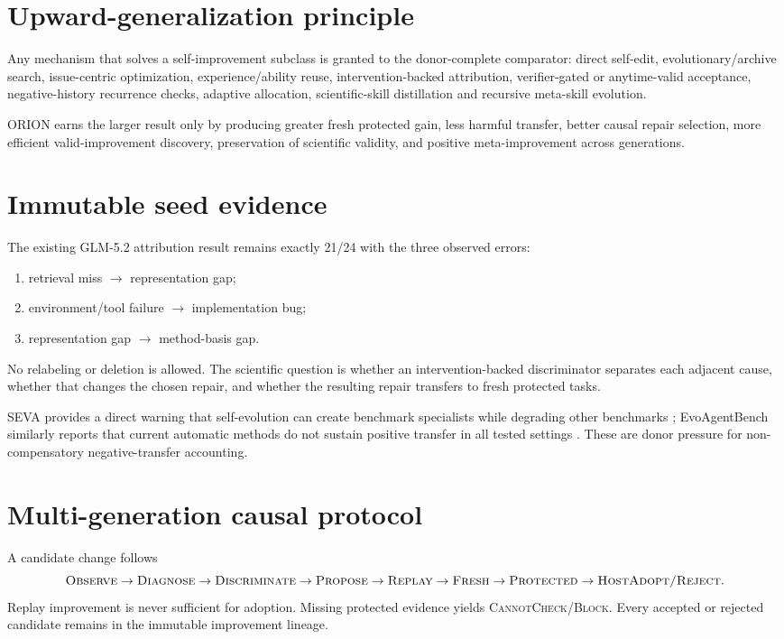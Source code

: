 \documentclass[11pt]{article}
\begin{document}
\section{Upward-generalization principle}
Any mechanism that solves a self-improvement subclass is granted to the donor-complete comparator: direct self-edit, evolutionary/archive search, issue-centric optimization, experience/ability reuse, intervention-backed attribution, verifier-gated or anytime-valid acceptance, negative-history recurrence checks, adaptive allocation, scientific-skill distillation and recursive meta-skill evolution.

ORION earns the larger result only by producing greater fresh protected gain, less harmful transfer, better causal repair selection, more efficient valid-improvement discovery, preservation of scientific validity, and positive meta-improvement across generations.

\section{Immutable seed evidence}
The existing GLM-5.2 attribution result remains exactly 21/24 with the three observed errors:
\begin{enumerate}
    \item retrieval miss $\rightarrow$ representation gap;
    \item environment/tool failure $\rightarrow$ implementation bug;
    \item representation gap $\rightarrow$ method-basis gap.
\end{enumerate}
No relabeling or deletion is allowed. The scientific question is whether an intervention-backed discriminator separates each adjacent cause, whether that changes the chosen repair, and whether the resulting repair transfers to fresh protected tasks.

SEVA provides a direct warning that self-evolution can create benchmark specialists while degrading other benchmarks \cite{seva2026}; EvoAgentBench similarly reports that current automatic methods do not sustain positive transfer in all tested settings \cite{evoagentbench2026}. These are donor pressure for non-compensatory negative-transfer accounting.

\section{Multi-generation causal protocol}
A candidate change follows
\[
\textsc{Observe}\to\textsc{Diagnose}\to\textsc{Discriminate}\to\textsc{Propose}\to\textsc{Replay}\to\textsc{Fresh}\to\textsc{Protected}\to\textsc{HostAdopt/Reject}.
\]
Replay improvement is never sufficient for adoption. Missing protected evidence yields \textsc{CannotCheck/Block}. Every accepted or rejected candidate remains in the immutable improvement lineage.
\end{document}
